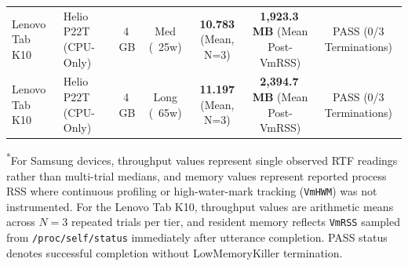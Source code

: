 \begin{table}[htbp]
{\begin{tabular}{llccccc}
Lenovo Tab K10 & Helio P22T (CPU-Only) & 4\,GB & Med (~25w) & \textbf{10.783} (Mean, N=3) & \textbf{1,923.3\,MB} (Mean Post-VmRSS) & PASS (0/3 Terminations) \\
Lenovo Tab K10 & Helio P22T (CPU-Only) & 4\,GB & Long (~65w) & \textbf{11.197} (Mean, N=3) & \textbf{2,394.7\,MB} (Mean Post-VmRSS) & PASS (0/3 Terminations) \\
\bottomrule
\end{tabular}%
}
\vspace{0.6ex}
\begin{minipage}{\textwidth}
\footnotesize
\textsuperscript{*}For Samsung devices, throughput values represent single observed RTF readings rather than multi-trial medians, and memory values represent reported process RSS where continuous profiling or high-water-mark tracking (\texttt{VmHWM}) was not instrumented. For the Lenovo Tab K10, throughput values are arithmetic means across $N=3$ repeated trials per tier, and resident memory reflects \texttt{VmRSS} sampled from \texttt{/proc/self/status} immediately after utterance completion. PASS status denotes successful completion without LowMemoryKiller termination.
\end{minipage}
\end{table}


